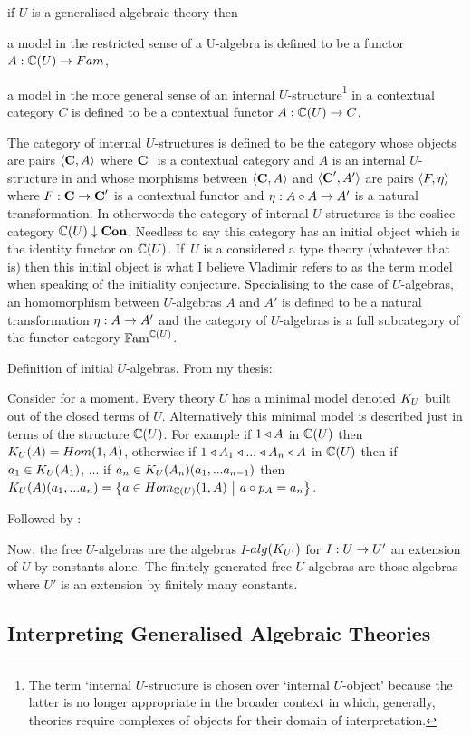 {if $U$ is a generalised algebraic theory then
\begin{point}
 a model in the restricted sense of a U-algebra is defined to be a functor $A: \ccat[C](U) \morph Fam$, 
\end{point}
\begin{point}
a model in the more general sense of an internal $U$-structure\footnote{The  term `internal $U$-structure is chosen over `internal $U$-object' because the latter
is no longer appropriate in the broader context in which, generally, theories require complexes of objects for their domain of interpretation.} in a contextual category
$C$ is defined to be a contextual functor $A: \ccat[C](U) \morph C$.
\end{point}
The category of internal $U$-structures is defined to be the category whose objects
are pairs $\tuple{\catc,A}$ 
where $\catcw$ is a contextual 
category and $A$ is an internal 
$U$-structure in
 \catcw and whose morphisms between $\tuple{\catc,A}$ and $\tuple{\catc',A'}$ are pairs $\tuple{F, \eta}$ where
$F: \catc \morph \catc'$ is a contextual functor and $\eta: A \circ A \morph  A'$ is a natural transformation.
In otherwords the category of internal $U$-structures
is  the coslice category
$\CofU \downarrow \catCon$. Needless to say this category has an initial object which is the identity functor on  $\CofU$.
If\ $U$ is a considered a type theory (whatever that is) then this initial object is what I believe Vladimir  refers
to as the term model when speaking of the initiality conjecture. 
Specialising to the case of $U$-algebras,  an homomorphism between $U$-algebras $A$ and $A'$ is defined to be a 
natural transformation $\eta: A \morph A'$ and the category of $U$-algebras is a full subcategory of the 
functor category $\Fam^{\CofU}$. 

\note 
Definition of initial $U$-algebras. From my thesis:
\begin{tightquote}
Consider for a moment. Every theory $U$ has a minimal model denoted $\KU$ built out of the closed terms of $U$. Alternatively this minimal model is described just in terms of the structure $\CofU$. For example
if $1 \base A$ in $\CofU$ then 
$\KU(A)=Hom(1,A)$, otherwise if $1 \base A_1 \base ... \base A_n \base A$ in $\CofU$
then if $a_1 \in \KU(A_1)$, ... if $a_n \in \KU(A_n)(a_1,...a_{n-1})$ then 
$\KU(A)(a_1,...a_n)=\setsuchthat{a\in Hom_{\CofU}(1,A)}{a \circ p_A = a_n}$. \\
\end{tightquote} 

Followed by :
\begin{tightquote}
Now, the free $U$-algebras are the algebras $I$-$alg(\KUp)$ for $I: U \morph U'$ an extension of $U$ by constants alone. The finitely generated free $U$-algebras are those algebras where $U'$ is an extension by finitely many constants. \\
\end{tightquote}

\subsection{Interpreting Generalised Algebraic Theories}}
